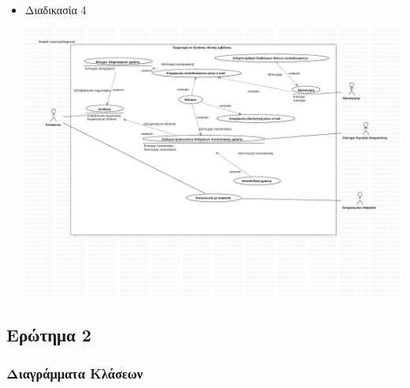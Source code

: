 \documentclass[a4paper, titlepage, twoside]{article}
\begin{document}
\begin{itemize}
\begin{center}
\end{center}
\item Διαδικασία 4
\label{sec:orgf548b38}
\begin{center}
\includegraphics[width=.9\linewidth]{use-case_4.pdf}
\end{center}
\end{itemize}

\subsection{Ερώτημα 2}
\label{sec:org9dddf03}

\subsubsection*{Διαγράμματα Κλάσεων}
\label{sec:orgc4066d0}
\end{document}
